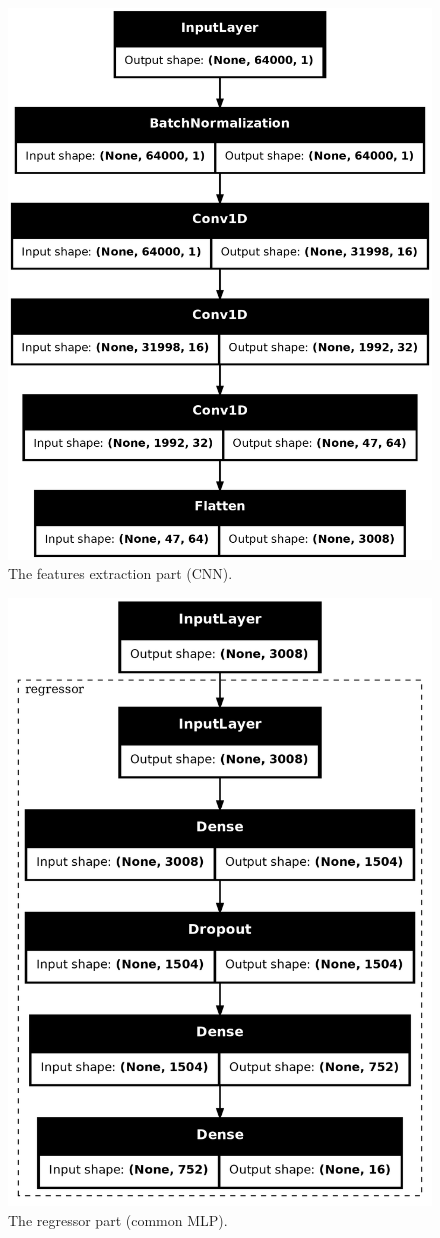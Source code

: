\documentclass[sigconf,natbib=false]{acmart}
\begin{document}
\begin{figure}[h]
 \centering
 \includegraphics[width=0.8\linewidth]{figs/projecao.png}
 \caption{The features extraction part (CNN).}
\end{figure}

\begin{figure}[h]
 \centering
 \includegraphics[width=0.8\linewidth]{figs/regressao.png}
 \caption{The regressor part (common MLP).}
\end{figure}
\end{document}
